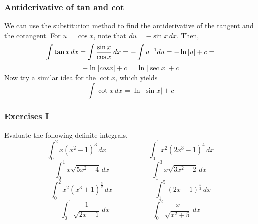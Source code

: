 \documentclass[xcolor=dvipsnames]{beamer}
\begin{document}
\begin{frame}
  \frametitle{Antiderivative of tan and cot}
We can use the substitution method to find the antiderivative of the
tangent and the cotangent. For $u=\cos{}x$, note that
$du=-\sin{}x\,dx$. Then,
\begin{equation}
  \label{eq:aibeajuh}
  \int\tan{}x\,dx=\int\frac{\sin{}x}{\cos{}x}\,dx=-\int{}u^{-1}du=-\ln{}|u|+c=\notag
\end{equation}
\begin{equation}
  \label{eq:eeroteda}
-\ln|cos{}x|+c=\ln|\sec{}x|+c
\end{equation}
Now try a similar idea for the $\cot{}x$, which yields
\begin{equation}
  \label{eq:eekahchi}
  \int{}\cot{}x\,dx=\ln|\sin{}x|+c
\end{equation}
\end{frame}

\begin{frame}
  \frametitle{Exercises I}
Evaluate the following definite integrals.
\begin{equation}
  \label{eq:mauphouw}
  \int_{0}^{2}x(x^{2}-1)^{3}\,dx\hspace{1in}\int_{0}^{1}x^{2}(2x^{3}-1)^{4}\,dx
\end{equation}
\begin{equation}
  \label{eq:pahteeth}
  \int_{0}^{1}x\sqrt{5x^{2}+4}\,dx\hspace{1in}\int_{1}^{3}x\sqrt{3x^{2}-2}\,dx
\end{equation}
\begin{equation}
  \label{eq:ceiquoor}
  \int_{0}^{2}x^{2}(x^{3}+1)^{\frac{3}{2}}\,dx\hspace{1in}\int_{1}^{5}(2x-1)^{\frac{5}{2}}\,dx
\end{equation}
\begin{equation}
  \label{eq:riweevie}
  \int_{0}^{1}\frac{1}{\sqrt{2x+1}}\,dx\hspace{1in}\int_{0}^{2}\frac{x}{\sqrt{x^{2}+5}}\,dx
\end{equation}
\end{frame}
\end{document}
